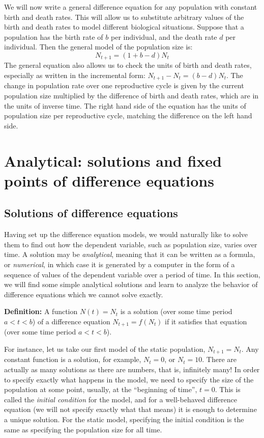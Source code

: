 \documentclass[11pt]{book}
\begin{document}
We will now write a general difference equation for any population with constant birth and death rates. This will allow us to substitute arbitrary values of the birth and death rates to model different biological situations. Suppose that a population has the birth rate of $b$ per individual, and the death rate $d$ per individual. Then the general model of the population size is:
\begin{equation}
 N_{t+1} = (1 + b - d)N_t
 \label{linear_pop}
 \end{equation}
The general equation also allows us to check the units of birth and death rates, especially as written in the incremental form: $ N_{t+1} - N_t = (b - d)N_t$. The change in population rate over one reproductive cycle is given by the current population size multiplied by the difference of birth and death rates, which are in the units of inverse time. The right hand side of the equation has the units of population size per reproductive cycle, matching the difference on the left hand side.

\section[Solutions and fixed points]{Analytical: solutions and fixed points of difference equations}
\subsection{Solutions of difference equations}
Having set up the difference equation models, we would naturally like to solve them to find out how the dependent variable, such as  population size, varies over time. A solution may be \emph{analytical}, meaning that it can be written as a formula, or \emph{numerical}, in which case it is generated by a computer in the form of a sequence of values of the dependent variable over a period of time. In this section, we will find some simple analytical solutions and learn to analyze the behavior of difference equations which we cannot solve exactly.

\textbf{Definition:} A function $N(t) = N_t$ is a solution (over some time period $a < t < b$) of a difference equation $N_{t+1} = f(N_t)$ if it satisfies that equation (over some time period $a < t < b$).

For instance, let us take our first model of the static population, $ N_{t+1} = N_t$. Any constant function is a solution, for example, $N_t = 0$, or $N_t = 10$. There are actually as many solutions as there are numbers, that is, infinitely many! In order to specify exactly what happens in the model, we need to specify the size of the population at some point, usually, at the ``beginning of time'', $t = 0$. This is called  the \emph{initial condition} for the model, and for a well-behaved difference equation (we will not specify exactly what that means) it is enough to determine a unique solution. For the static model, specifying the initial condition is the same as specifying the population size for all time.
\end{document}
